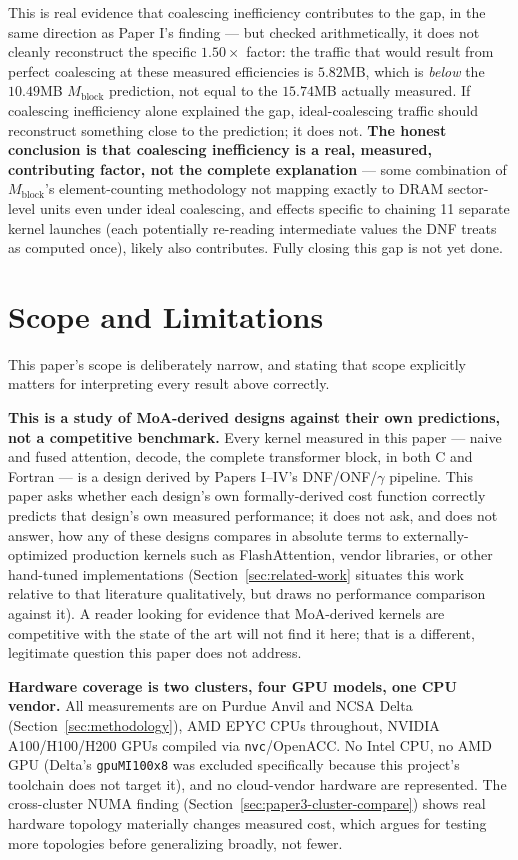 \documentclass[11pt]{article}
\begin{document}
This is real evidence that coalescing inefficiency contributes to the
gap, in the same direction as Paper I's finding --- but checked
arithmetically, it does not cleanly reconstruct the specific
$1.50\times$ factor: the traffic that would result from perfect
coalescing at these measured efficiencies is $5.82$MB, which is
\emph{below} the $10.49$MB $M_{\mathrm{block}}$ prediction, not equal
to the $15.74$MB actually measured. If coalescing inefficiency alone
explained the gap, ideal-coalescing traffic should reconstruct
something close to the prediction; it does not. \textbf{The honest
conclusion is that coalescing inefficiency is a real, measured,
contributing factor, not the complete explanation} --- some combination
of $M_{\mathrm{block}}$'s element-counting methodology not mapping
exactly to DRAM sector-level units even under ideal coalescing, and
effects specific to chaining 11 separate kernel launches (each
potentially re-reading intermediate values the DNF treats as
computed once), likely also contributes. Fully closing this gap is not
yet done.

\section{Scope and Limitations}
\label{sec:scope}

This paper's scope is deliberately narrow, and stating that scope
explicitly matters for interpreting every result above correctly.

\textbf{This is a study of MoA-derived designs against their own
predictions, not a competitive benchmark.} Every kernel measured in
this paper --- naive and fused attention, decode, the complete
transformer block, in both C and Fortran --- is a design derived by
Papers I--IV's DNF/ONF/$\gamma$ pipeline. This paper asks whether each
design's own formally-derived cost function correctly predicts that
design's own measured performance; it does not ask, and does not
answer, how any of these designs compares in absolute terms to
externally-optimized production kernels such as FlashAttention,
vendor libraries, or other hand-tuned implementations
(Section~\ref{sec:related-work} situates this work relative to that
literature qualitatively, but draws no performance comparison against
it). A reader looking for evidence that MoA-derived kernels are
competitive with the state of the art will not find it here; that is a
different, legitimate question this paper does not address.

\textbf{Hardware coverage is two clusters, four GPU models, one CPU
vendor.} All measurements are on Purdue Anvil and NCSA Delta
(Section~\ref{sec:methodology}), AMD EPYC CPUs throughout, NVIDIA
A100/H100/H200 GPUs compiled via \texttt{nvc}/OpenACC. No Intel CPU, no
AMD GPU (Delta's \texttt{gpuMI100x8} was excluded specifically because
this project's toolchain does not target it), and no cloud-vendor
hardware are represented. The cross-cluster NUMA finding
(Section~\ref{sec:paper3-cluster-compare}) shows real hardware
topology materially changes measured cost, which argues for testing
more topologies before generalizing broadly, not fewer.
\end{document}
